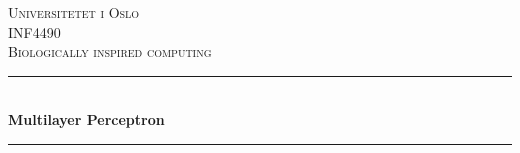 \documentclass[a4paper, norsk, 12pt]{article}
\begin{document}
\begin{titlepage}

\newcommand{\HRule}{\rule{\linewidth}{0.5mm}} %

\center %


\textsc{\LARGE Universitetet i Oslo}\\[1.5cm] %
\textsc{\Large INF4490}\\[0.5cm] %
\textsc{\large Biologically inspired computing}\\[0.5cm] %


\HRule \\[0.4cm]
{ \huge \bfseries Multilayer Perceptron}\\[0.4cm] %
\HRule \\[1.5cm]




\Large


\end{titlepage}
\end{document}
